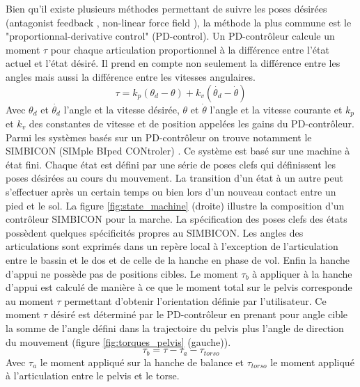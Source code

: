 \documentclass[runningheads,a4paper]{llncs}
\begin{document}
Bien qu'il existe plusieurs méthodes permettant de suivre les poses désirées (antagonist feedback \cite{neff2002modeling}, non-linear force field \cite{mussa1997nonlinear}), la méthode la plus commune est le "proportionnal-derivative control" (PD-control). Un PD-contrôleur calcule un moment  \(\tau\) pour chaque articulation proportionnel à la différence entre l'état actuel et l'état désiré. Il prend en compte non seulement la différence entre les angles mais aussi la différence entre les vitesses angulaires. 
\begin{equation}
\tau=k_p(\theta_d - \theta) + k_v(\dot{\theta_d} - \dot{\theta})
\label{eq:pd_controler}
\end{equation}
Avec \(\theta_d\) et \(\dot{\theta_d}\) l'angle et la vitesse désirée, \(\theta\) et \(\dot{\theta}\) l'angle et la vitesse courante et \(k_p\) et \(k_v\) des constantes de vitesse et de position appelées les gains du PD-contrôleur.
Parmi les systèmes basés sur un PD-contrôleur on trouve notamment le SIMBICON (SIMple BIped CONtroler) \cite{yin2007simbicon}. Ce système est basé sur une machine à état fini. Chaque état est défini par une série de poses clefs qui définissent les poses désirées au cours du mouvement. La transition d'un état à un autre peut s'effectuer après un certain temps ou bien lors d'un nouveau contact entre un pied et le sol. La figure \ref{fig:state_machine} (droite) illustre la composition d'un contrôleur SIMBICON pour la marche. La spécification des poses clefs des états possèdent quelques spécificités propres au SIMBICON. Les angles des articulations sont exprimés dans un repère local à l'exception de l'articulation entre le bassin et le dos et de celle de la hanche en phase de vol. Enfin la hanche d'appui ne possède pas de positions cibles. Le moment \(\tau_b \) à appliquer à la hanche d'appui est calculé de manière à ce que le moment total sur le pelvis corresponde au moment \(\tau \) permettant d'obtenir l'orientation définie par l'utilisateur. Ce moment \(\tau \) désiré est déterminé par le PD-contrôleur en prenant pour angle cible la somme de l'angle défini dans la trajectoire du pelvis plus l'angle de direction du mouvement (figure \ref{fig:torques_pelvis} (gauche)).
\[
\tau_b=\tau - \tau_a - \tau_{torso}
\]
Avec \(\tau_a \) le moment appliqué sur la hanche de balance et \(\tau_{torso} \) le moment appliqué à l'articulation entre le pelvis et le torse.
\vspace*{-0.5cm}
\end{document}
